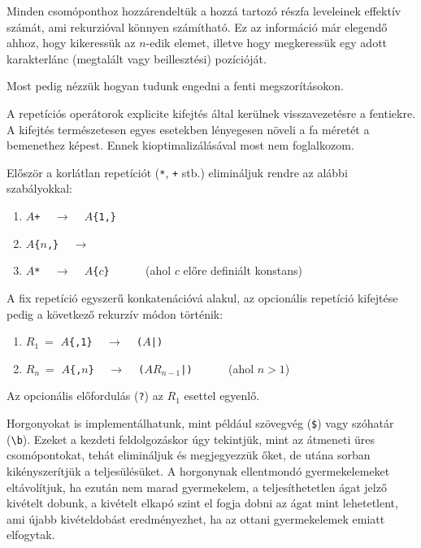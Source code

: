 \documentclass[
    parspace,
    noindent,
    nohyp,
]{elteiktdk}[2023/04/10]
\begin{document}

Minden csomóponthoz hozzárendeltük a hozzá tartozó részfa leveleinek effektív számát,
ami rekurzióval könnyen számítható.
Ez az információ már elegendő ahhoz, hogy kikeressük az $n$-edik elemet,
illetve hogy megkeressük egy adott karakterlánc (megtalált vagy beillesztési) pozícióját.



Most pedig nézzük hogyan tudunk engedni a fenti megszorításokon.

A repetíciós operátorok explicite kifejtés által kerülnek visszavezetésre a fentiekre.
A kifejtés természetesen egyes esetekben lényegesen növeli a fa méretét a bemenethez képest.
Ennek kioptimalizálásával most nem foglalkozom.

Először a korlátlan repetíciót (\texttt{*}, \texttt{+} stb.) elimináljuk rendre az alábbi szabályokkal:

\begin{enumerate}
    \item \texttt{$A$+} ~ $\longrightarrow$ ~ \texttt{$A$\{1,\}}
    \item \texttt{$A$\{$n$,\}} ~ $\longrightarrow$ ~ 
    \item \texttt{$A$*} ~ $\longrightarrow$ ~ \texttt{$A$\{$c$\}} ~~~~~ (ahol $c$ előre definiált konstans)
\end{enumerate}

A fix repetíció egyszerű konkatenációvá alakul,
az opcionális repetíció kifejtése pedig a következő rekurzív módon történik:

\begin{enumerate}
    \item $R_1~=$ \texttt{$A$\{,1\}} ~ $\longrightarrow$ ~ \texttt{($A$|)}
    \item $R_n~=$ \texttt{$A$\{,$n$\}} ~ $\longrightarrow$ ~ \texttt{($AR_{n-1}$|)} ~~~~~ (ahol $n>1$)
\end{enumerate}

Az opcionális előfordulás (\texttt{?}) az $R_1$ esettel egyenlő.



Horgonyokat is implementálhatunk,
mint például szövegvég (\texttt{\$}) vagy szóhatár (\texttt{{\textbackslash}b}).
Ezeket a kezdeti feldolgozáskor úgy tekintjük,
mint az átmeneti üres csomópontokat, tehát elimináljuk és megjegyezzük őket,
de utána sorban kikényszerítjük a teljesülésüket.
A horgonynak ellentmondó gyermekelemeket eltávolítjuk,
ha ezután nem marad gyermekelem, a teljesíthetetlen ágat jelző kivételt dobunk,
a kivételt elkapó szint el fogja dobni az ágat mint lehetetlent,
ami újabb kivételdobást eredményezhet, ha az ottani gyermekelemek emiatt elfogytak.
\end{document}
